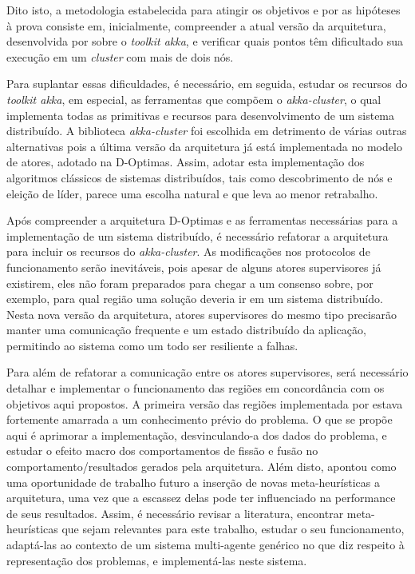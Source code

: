 Dito isto, a metodologia estabelecida para atingir os objetivos e por as hipóteses à prova consiste em, inicialmente, compreender a atual versão da arquitetura, desenvolvida por  sobre o \textit{toolkit akka}, e verificar quais pontos têm dificultado sua execução em um \textit{cluster} com mais de dois nós. 

Para suplantar essas dificuldades, é necessário, em seguida, estudar os recursos do \textit{toolkit akka}, em especial, as ferramentas que compõem o \textit{akka-cluster}, o qual implementa todas as primitivas e recursos para desenvolvimento de um sistema distribuído. A biblioteca \textit{akka-cluster} foi escolhida em detrimento de várias outras alternativas pois a última versão da arquitetura já está implementada no modelo de atores, adotado na D-Optimas. Assim, adotar esta implementação dos algoritmos clássicos de sistemas distribuídos, tais como descobrimento de nós e eleição de líder, parece uma escolha natural e que leva ao menor retrabalho.

Após compreender a arquitetura D-Optimas e as ferramentas necessárias para a implementação de um sistema distribuído, é necessário refatorar a arquitetura para incluir os recursos do \textit{akka-cluster}. As modificações nos protocolos de funcionamento serão inevitáveis, pois apesar de alguns atores supervisores já existirem, eles não foram preparados para chegar a um consenso sobre, por exemplo, para qual região uma solução deveria ir em um sistema distribuído. Nesta nova versão da arquitetura, atores supervisores do mesmo tipo precisarão manter uma comunicação frequente e um estado distribuído da aplicação, permitindo ao sistema como um todo ser resiliente a falhas.

Para além de refatorar a comunicação entre os atores supervisores, será necessário detalhar e implementar o funcionamento das regiões em concordância com os objetivos aqui propostos. A primeira versão das regiões implementada por  estava fortemente amarrada a um conhecimento prévio do problema. O que se propõe aqui é aprimorar a implementação, desvinculando-a dos dados do problema, e estudar o efeito macro dos comportamentos de fissão e fusão no comportamento/resultados gerados pela arquitetura. Além disto,  apontou como uma oportunidade de trabalho futuro a inserção de novas meta-heurísticas a arquitetura, uma vez que a escassez delas pode ter influenciado na performance de seus resultados. Assim, é necessário revisar a literatura, encontrar meta-heurísticas que sejam relevantes para este trabalho, estudar o seu funcionamento, adaptá-las ao contexto de um sistema multi-agente genérico no que diz respeito à representação dos problemas, e implementá-las neste sistema.

